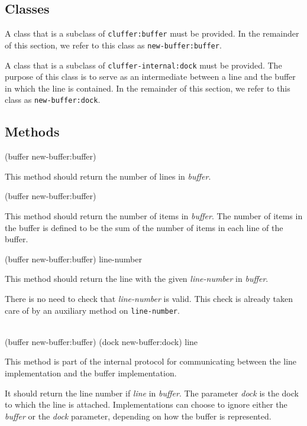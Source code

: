 \subsection{Classes}

A class that is a subclass of \texttt{cluffer:buffer} must be
provided.  In the remainder of this section, we refer to this class as
\texttt{new-buffer:buffer}.

A class that is a subclass of \texttt{cluffer-internal:dock} must be
provided.  The purpose of this class is to serve as an intermediate
between a line and the buffer in which the line is contained.
In the remainder of this section, we refer to this class as
\texttt{new-buffer:dock}.

\subsection{Methods}

 {(buffer new-buffer:buffer)}

This method should return the number of lines in \textit{buffer}.

 {(buffer new-buffer:buffer)}

This method should return the number of items in \textit{buffer}.
The number of items in the buffer is defined to be the sum of the
number of items in each line of the buffer.

 {(buffer new-buffer:buffer) line-number}

This method should return the line with the given \textit{line-number}
in \textit{buffer}.

There is no need to check that \textit{line-number} is valid.
This check is already taken care of by an auxiliary method on
\texttt{line-number}.

\\
{(buffer new-buffer:buffer) (dock new-buffer:dock) line}

This method is part of the internal protocol for communicating between
the line implementation and the buffer implementation.

It should return the line number if \textit{line} in \textit{buffer}.
The parameter \textit{dock} is the dock to which the line is attached.
Implementations can choose to ignore either the \textit{buffer} or the
\textit{dock} parameter, depending on how the buffer is represented.
